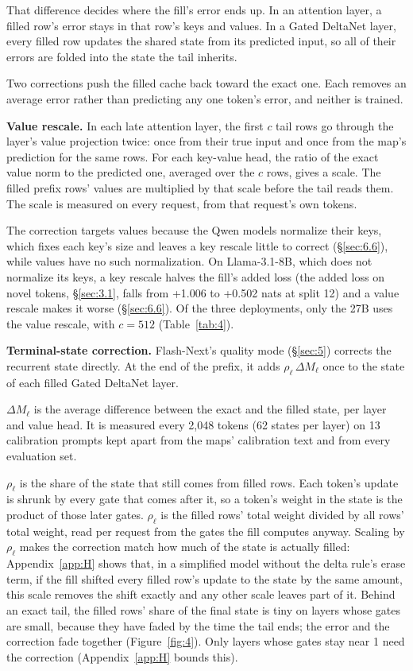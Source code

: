 \documentclass[11pt]{article}
\begin{document}
That difference decides where the fill's error ends up. In an attention layer, a filled row's error stays in that row's keys and values. In a Gated DeltaNet layer, every filled row updates the shared state from its predicted input, so all of their errors are folded into the state the tail inherits.

Two corrections push the filled cache back toward the exact one. Each removes an average error rather than predicting any one token's error, and neither is trained.

\textbf{Value rescale.} In each late attention layer, the first $c$ tail rows go through the layer's value projection twice: once from their true input and once from the map's prediction for the same rows. For each key-value head, the ratio of the exact value norm to the predicted one, averaged over the $c$ rows, gives a scale. The filled prefix rows' values are multiplied by that scale before the tail reads them. The scale is measured on every request, from that request's own tokens.

The correction targets values because the Qwen models normalize their keys, which fixes each key's size and leaves a key rescale little to correct (\S\ref{sec:6.6}), while values have no such normalization. On Llama-3.1-8B, which does not normalize its keys, a key rescale halves the fill's added loss (the added loss on novel tokens, \S\ref{sec:3.1}, falls from +1.006 to +0.502 nats at split 12) and a value rescale makes it worse (\S\ref{sec:6.6}). Of the three deployments, only the 27B uses the value rescale, with $c = 512$ (Table~\ref{tab:4}).

\textbf{Terminal-state correction.} Flash-Next's quality mode (\S\ref{sec:5}) corrects the recurrent state directly. At the end of the prefix, it adds $\rho_\ell\,\Delta M_\ell$ once to the state of each filled Gated DeltaNet layer.

$\Delta M_\ell$ is the average difference between the exact and the filled state, per layer and value head. It is measured every 2,048 tokens (62 states per layer) on 13 calibration prompts kept apart from the maps' calibration text and from every evaluation set.

$\rho_\ell$ is the share of the state that still comes from filled rows. Each token's update is shrunk by every gate that comes after it, so a token's weight in the state is the product of those later gates. $\rho_\ell$ is the filled rows' total weight divided by all rows' total weight, read per request from the gates the fill computes anyway. Scaling by $\rho_\ell$ makes the correction match how much of the state is actually filled: Appendix~\ref{app:H} shows that, in a simplified model without the delta rule's erase term, if the fill shifted every filled row's update to the state by the same amount, this scale removes the shift exactly and any other scale leaves part of it. Behind an exact tail, the filled rows' share of the final state is tiny on layers whose gates are small, because they have faded by the time the tail ends; the error and the correction fade together (Figure~\ref{fig:4}). Only layers whose gates stay near 1 need the correction (Appendix~\ref{app:H} bounds this).
\end{document}
